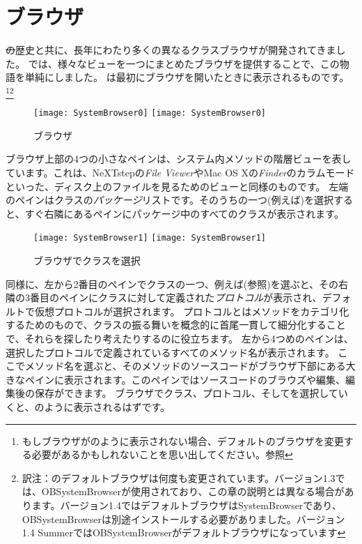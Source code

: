 \documentclass[a4paper,10pt,twoside]{book}
\begin{document}
\section{ブラウザ}

\st の歴史と共に、長年にわたり多くの異なるクラスブラウザが開発されてきました。
\pharo では、様々なビューを一つにまとめたブラウザを提供することで、この物語を単純にしました。
は最初にブラウザを開いたときに表示されるものです。\footnote{もしブラウザがのように表示されない場合、デフォルトのブラウザを変更する必要があるかもしれないことを思い出してください。参照}\footnote{訳注：\pharo のデフォルトブラウザは何度も変更されています。バージョン1.3では、OBSystemBrowserが使用されており、この章の説明とは異なる場合があります。バージョン1.4ではデフォルトブラウザはSystemBrowserであり、OBSystemBrowserは別途インストールする必要がありました。バージョン1.4 SummerではOBSystemBrowserがデフォルトブラウザになっています}

\begin{figure}[htbp]
   \centering
   \ifluluelse
{\texttt{[image: SystemBrowser0]} }
{\texttt{[image: SystemBrowser0]} }
   \caption{ブラウザ}
\end{figure}

ブラウザ上部の4つの小さなペインは、システム内メソッドの階層ビューを表しています。これは、NeXTstepの\textit{File Viewer}やMac OS Xの\textit{Finder}のカラムモードといった、ディスク上のファイルを見るためのビューと同様のものです。
左端のペインはクラスの\emph{パッケージ}リストです。そのうちの一つ(例えば)を選択すると、すぐ右隣にあるペインにパッケージ中のすべてのクラスが表示されます。

\begin{figure}[htbp]
   \centering
   \ifluluelse
{\texttt{[image: SystemBrowser1]} }
{\texttt{[image: SystemBrowser1]} }
   \caption{ブラウザでクラスを選択
   }
\end{figure}

同様に、左から2番目のペインでクラスの一つ、例えば(参照)を選ぶと、その右隣の3番目のペインにクラスに対して定義された\emph{プロトコル}が表示され、デフォルトで仮想プロトコルが選択されます。
プロトコルとはメソッドをカテゴリ化するためのもので、クラスの振る舞いを概念的に首尾一貫して細分化することで、それらを探したり考えたりするのに役立ちます。
左から4つめのペインは、選択したプロトコルで定義されているすべてのメソッド名が表示されます。
ここでメソッド名を選ぶと、そのメソッドのソースコードがブラウザ下部にある大きなペインに表示されます。このペインではソースコードのブラウズや編集、編集後の保存ができます。
ブラウザでクラス、プロトコル、そしてを選択していくと、のように表示されるはずです。
\end{document}
